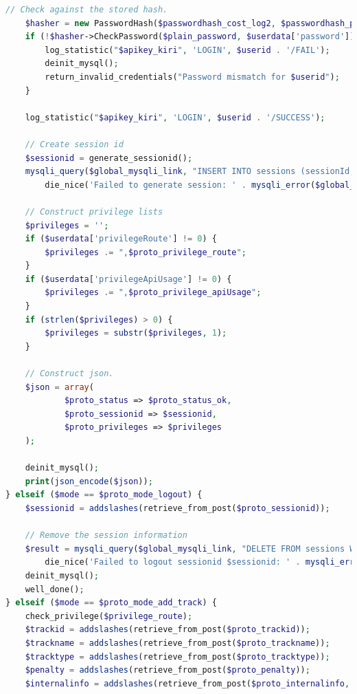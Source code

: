 \documentclass[a4paper,twoside]{article}
\begin{document}
\begin{enumerate}
\begin{lstlisting}[language=PHP,basicstyle=\tiny,caption=handle.php,label={lst:handle.php}]
	// Check against the stored hash.
	$hasher = new PasswordHash($passwordhash_cost_log2, $passwordhash_portable);
	if (!$hasher->CheckPassword($plain_password, $userdata['password'])) {
		log_statistic("$apikey_kiri", 'LOGIN', $userid . '/FAIL');
		deinit_mysql();
		return_invalid_credentials("Password mismatch for $userid");
	}
	
	log_statistic("$apikey_kiri", 'LOGIN', $userid . '/SUCCESS');
	
	// Create session id
	$sessionid = generate_sessionid();
	mysqli_query($global_mysqli_link, "INSERT INTO sessions (sessionId, email) VALUES ('$sessionid', '$userid')") or
		die_nice('Failed to generate session: ' . mysqli_error($global_mysqli_link), true);

	// Construct privilege lists
	$privileges = '';
	if ($userdata['privilegeRoute'] != 0) {
		$privileges .= ",$proto_privilege_route";
	}
	if ($userdata['privilegeApiUsage'] != 0) {
		$privileges .= ",$proto_privilege_apiUsage";
	}
	if (strlen($privileges) > 0) {
		$privileges = substr($privileges, 1);
	}
	
	// Construct json.
	$json = array(
			$proto_status => $proto_status_ok,
			$proto_sessionid => $sessionid,
			$proto_privileges => $privileges
	);
	
	deinit_mysql();
	print(json_encode($json));
} elseif ($mode == $proto_mode_logout) {
	$sessionid = addslashes(retrieve_from_post($proto_sessionid));

	// Remove the session information
	$result = mysqli_query($global_mysqli_link, "DELETE FROM sessions WHERE sessionId='$sessionid'") or
		die_nice('Failed to logout sessionid $sessionid: ' . mysqli_error($global_mysqli_link), true);
	deinit_mysql();
	well_done();	
} elseif ($mode == $proto_mode_add_track) {
	check_privilege($privilege_route); 
	$trackid = addslashes(retrieve_from_post($proto_trackid));
	$trackname = addslashes(retrieve_from_post($proto_trackname));
	$tracktype = addslashes(retrieve_from_post($proto_tracktype));
	$penalty = addslashes(retrieve_from_post($proto_penalty));
	$internalinfo = addslashes(retrieve_from_post($proto_internalinfo, false)) or $internalinfo = '';
	

\end{lstlisting}
\end{enumerate}
\end{document}
